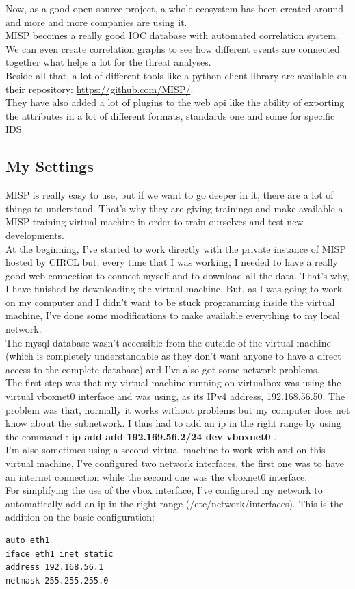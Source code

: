 \documentclass{eplmastersthesis}
\begin{document}
Now, as a good open source project, a whole ecosystem has been created around and more and more companies are using it.\\
MISP becomes a really good IOC database with automated correlation system. We can even create correlation graphs to see how different events are connected together what helps a lot for the threat analyses.\\
Beside all that, a lot of different tools like a python client library are available on their repository: \url{https://github.com/MISP/}.\\
They have also added a lot of plugins to the web api like the ability of exporting the attributes in a lot of different formats, standards one and some for specific IDS.\\

\subsection{My Settings}

MISP is really easy to use, but if we want to go deeper in it, there are a lot of things to understand. That's why they are giving trainings and make available a MISP training virtual machine in order to train ourselves and test new developments.\\
At the beginning, I've started to work directly with the private instance of MISP hosted by CIRCL but, every time that I was working, I needed to have a really good web connection to connect myself and to download all the data. That's why, I have finished by downloading the virtual machine. But, as I was going to work on my computer and I didn't want to be stuck programming inside the virtual machine, I've done some modifications to make available everything to my local network.\\
The mysql database wasn't accessible from the outside of the virtual machine (which is completely understandable as they don't want anyone to have a direct access to the complete database) and I've also got some network problems.\\
The first step was that my virtual machine running on virtualbox was using the virtual vboxnet0 interface and was using, as its IPv4 address, 192.168.56.50. The problem was that, normally it works without problems but my computer does not know about the subnetwork. I thus had to add an ip in the right range by using the command :
\textbf{ip add add 192.169.56.2/24 dev vboxnet0} .\\
I'm also sometimes using a second virtual machine to work with and on this virtual machine, I've configured two network interfaces, the first one was to have an internet connection while the second one was the vboxnet0 interface.\\
For simplifying the use of the vbox interface, I've configured my network to automatically add an ip in the right range (/etc/network/interfaces). This is the addition on the basic configuration:
\begin{verbatim}
auto eth1
iface eth1 inet static
address 192.168.56.1
netmask 255.255.255.0
\end{verbatim}
 
\end{document}
